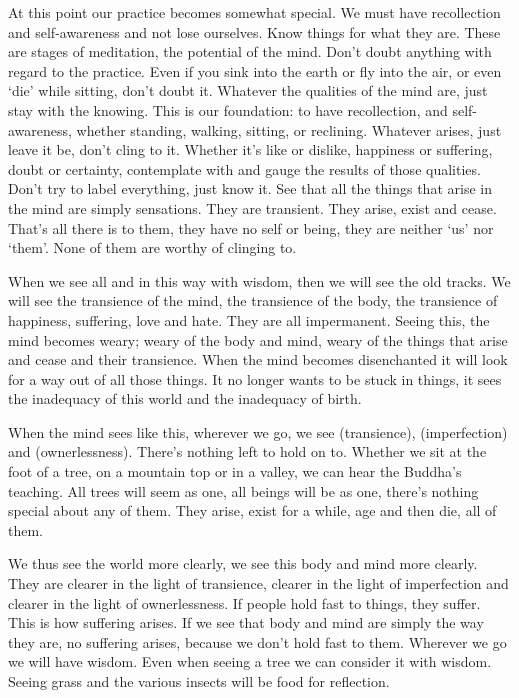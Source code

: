 At this point our practice becomes somewhat special. We must have recollection and self-awareness and not lose ourselves. Know things for what they are. These are stages of meditation, the potential of the mind. Don't doubt anything with regard to the practice. Even if you sink into the earth or fly into the air, or even `die' while sitting, don't doubt it. Whatever the qualities of the mind are, just stay with the knowing. This is our foundation: to have  recollection, and  self-awareness, whether standing, walking, sitting, or reclining. Whatever arises, just leave it be, don't cling to it. Whether it's like or dislike, happiness or suffering, doubt or certainty, contemplate with  and gauge the results of those qualities. Don't try to label everything, just know it. See that all the things that arise in the mind are simply sensations. They are transient. They arise, exist and cease. That's all there is to them, they have no self or being, they are neither `us' nor `them'. None of them are worthy of clinging to.

When we see all  and  in this way with wisdom, then we will see the old tracks. We will see the transience of the mind, the transience of the body, the transience of happiness, suffering, love and hate. They are all impermanent. Seeing this, the mind becomes weary; weary of the body and mind, weary of the things that arise and cease and their transience. When the mind becomes disenchanted it will look for a way out of all those things. It no longer wants to be stuck in things, it sees the inadequacy of this world and the inadequacy of birth.

When the mind sees like this, wherever we go, we see  (transience),  (imperfection) and  (ownerlessness). There's nothing left to hold on to. Whether we sit at the foot of a tree, on a mountain top or in a valley, we can hear the Buddha's teaching. All trees will seem as one, all beings will be as one, there's nothing special about any of them. They arise, exist for a while, age and then die, all of them.

We thus see the world more clearly, we see this body and mind more clearly. They are clearer in the light of transience, clearer in the light of imperfection and clearer in the light of ownerlessness. If people hold fast to things, they suffer. This is how suffering arises. If we see that body and mind are simply the way they are, no suffering arises, because we don't hold fast to them. Wherever we go we will have wisdom. Even when seeing a tree we can consider it with wisdom. Seeing grass and the various insects will be food for reflection.

